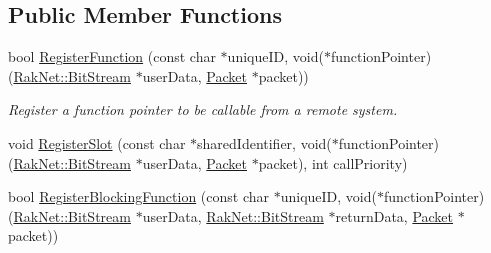 \subsection*{Public Member Functions}
\begin{DoxyCompactItemize}
\item 
bool \hyperlink{class_rak_net_1_1_r_p_c4_a62122f90344dbfc064f9b14e0f565b23}{Register\-Function} (const char $\ast$unique\-I\-D, void($\ast$function\-Pointer)(\hyperlink{class_rak_net_1_1_bit_stream}{Rak\-Net\-::\-Bit\-Stream} $\ast$user\-Data, \hyperlink{struct_rak_net_1_1_packet}{Packet} $\ast$packet))
\begin{DoxyCompactList}\small\item\em Register a function pointer to be callable from a remote system. \end{DoxyCompactList}\item 
void \hyperlink{class_rak_net_1_1_r_p_c4_a923fe77794363d8ec6094da98fd40d03}{Register\-Slot} (const char $\ast$shared\-Identifier, void($\ast$function\-Pointer)(\hyperlink{class_rak_net_1_1_bit_stream}{Rak\-Net\-::\-Bit\-Stream} $\ast$user\-Data, \hyperlink{struct_rak_net_1_1_packet}{Packet} $\ast$packet), int call\-Priority)
\item 
\hypertarget{class_rak_net_1_1_r_p_c4_a274362402c9476feb9575d06b75a5263}{bool \hyperlink{class_rak_net_1_1_r_p_c4_a274362402c9476feb9575d06b75a5263}{Register\-Blocking\-Function} (const char $\ast$unique\-I\-D, void($\ast$function\-Pointer)(\hyperlink{class_rak_net_1_1_bit_stream}{Rak\-Net\-::\-Bit\-Stream} $\ast$user\-Data, \hyperlink{class_rak_net_1_1_bit_stream}{Rak\-Net\-::\-Bit\-Stream} $\ast$return\-Data, \hyperlink{struct_rak_net_1_1_packet}{Packet} $\ast$packet))}\label{class_rak_net_1_1_r_p_c4_a274362402c9476feb9575d06b75a5263}


\end{DoxyCompactItemize}
